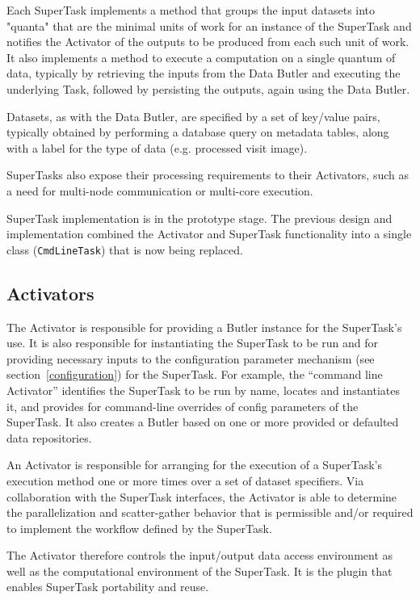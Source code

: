 \documentclass[DM,lsstdraft,toc]{lsstdoc}
\begin{document}
Each SuperTask implements a method that groups the input datasets into "quanta"
that are the minimal units of work for an instance of the SuperTask and
notifies the Activator of the outputs to be produced from each such unit of
work.  It also implements a method to execute a computation on a single quantum
of data, typically by retrieving the inputs from the Data Butler and executing
the underlying Task, followed by persisting the outputs, again using the Data
Butler.

Datasets, as with the Data Butler, are specified by a set of key/value pairs,
typically obtained by performing a database query on metadata tables, along
with a label for the type of data (e.g. processed visit image).

SuperTasks also expose their processing requirements to their Activators, such
as a need for multi-node communication or multi-core execution.

SuperTask implementation is in the prototype stage.  The previous design and
implementation combined the Activator and SuperTask functionality into a single
class (\texttt{CmdLineTask}) that is now being replaced.

\subsection{Activators}\label{activators}

The Activator is responsible for providing a Butler instance for the
SuperTask’s use. It is also responsible for instantiating the SuperTask to be
run and for providing necessary inputs to the configuration parameter mechanism
(see section~\ref{configuration}) for the SuperTask. For example, the “command
line Activator” identifies the SuperTask to be run by name, locates and
instantiates it, and provides for command-line overrides of config parameters
of the SuperTask. It also creates a Butler based on one or more provided or
defaulted data repositories.

An Activator is responsible for arranging for the execution of a SuperTask’s
execution method one or more times over a set of dataset specifiers. Via
collaboration with the SuperTask interfaces, the Activator is able to determine
the parallelization and scatter-gather behavior that is permissible and/or
required to implement the workflow defined by the SuperTask.

The Activator therefore controls the input/output data access environment as
well as the computational environment of the SuperTask.  It is the plugin that
enables SuperTask portability and reuse.
\end{document}
